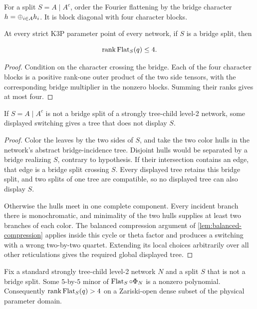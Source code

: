 For a split \(S=A\mid A^c\), order the Fourier flattening by the bridge
character \(h=\mathbin\oplus_{i\in A}h_i\).  It is block diagonal with four character
blocks.

\begin{proposition}\label{prop:true-cut}
At every strict K3P parameter point of every network, if \(S\) is a bridge
split, then

\[
 \operatorname{rank}\operatorname{Flat}_S(q)\le4.
\]
\end{proposition}

\begin{proof}
Condition on the character crossing the bridge.  Each of the four character
blocks is a positive rank-one outer product of the two side tensors, with the
corresponding bridge multiplier in the nonzero blocks.  Summing their ranks
gives at most four.
\end{proof}

\begin{lemma}
\label{lem:displayed-tree-noncut}
If \(S=A\mid A^c\) is not a bridge split of a strongly tree-child level-2
network, some displayed switching gives a tree that does not display \(S\).
\end{lemma}

\begin{proof}
Color the leaves by the two sides of \(S\), and take the two color hulls in
the network's abstract bridge-incidence tree.  Disjoint hulls would be
separated by a bridge realizing \(S\), contrary to hypothesis.  If their
intersection contains an edge, that edge is a bridge split crossing \(S\).
Every displayed tree retains this bridge split, and two splits of one tree
are compatible, so no displayed tree can also display \(S\).

Otherwise the hulls meet in one complete component.  Every incident branch
there is monochromatic, and minimality of the two hulls supplies at least two
branches of each color.  The balanced compression argument of
\cref{lem:balanced-compression} applies inside this cycle or theta factor and
produces a switching with a wrong two-by-two quartet.  Extending its local
choices arbitrarily over all other reticulations gives the required global
displayed tree.
\end{proof}

\begin{proposition}\label{prop:generic-noncut}
Fix a standard strongly tree-child level-2 network \(N\) and a split \(S\)
that is not a bridge split.  Some \(5\)-by-\(5\) minor of
\(\operatorname{Flat}_S\circ\Phi_N\)
is a nonzero polynomial.  Consequently
\(\operatorname{rank}\operatorname{Flat}_S(q)>4\) on a Zariski-open dense subset of the physical parameter
domain.
\end{proposition}

